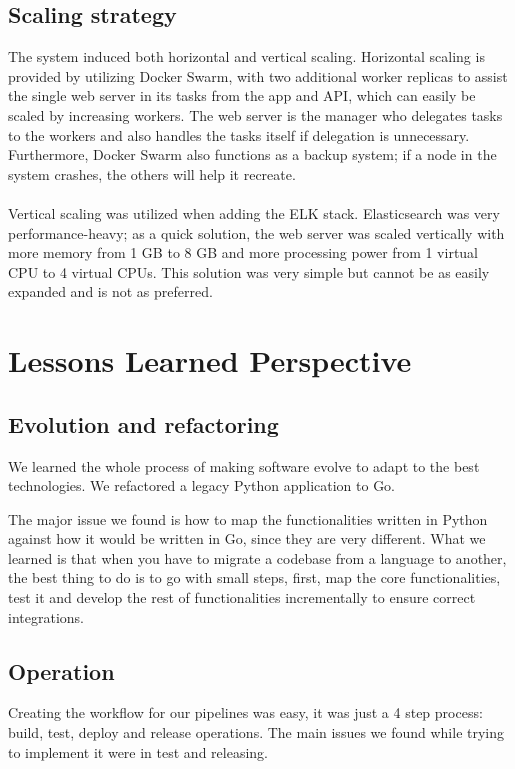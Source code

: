 \documentclass[12pt, a4paper, oneside]{book}
\begin{document}
\section{Scaling strategy}
The system induced both horizontal and vertical scaling.
Horizontal scaling is provided by utilizing Docker Swarm, with two additional worker replicas to assist the single web server in its tasks from the app and API, which can easily be scaled by increasing workers.
The web server is the manager who delegates tasks to the workers and also handles the tasks itself if delegation is unnecessary.
Furthermore, Docker Swarm also functions as a backup system; if a node in the system crashes, the others will help it recreate.\\
\\
Vertical scaling was utilized when adding the ELK stack.
Elasticsearch was very performance-heavy; as a quick solution, the web server was scaled vertically with more memory from 1 GB to 8 GB and more processing power from 1 virtual CPU to 4 virtual CPUs.
This solution was very simple but cannot be as easily expanded and is not as preferred.

\chapter{Lessons Learned Perspective}

\section{Evolution and refactoring}
We learned the whole process of making software evolve to adapt to the best technologies. We refactored a legacy Python application to Go.\bigskip

The major issue we found is how to map the functionalities written in Python against how it would be written in Go, since they are very different. What we learned is that when you have to migrate a codebase from a language to another, the best thing to do is to go with small steps, first, map the core functionalities, test it and develop the rest of functionalities incrementally to ensure correct integrations.
\section{Operation}
Creating the workflow for our pipelines was easy, it was just a 4 step process: build, test, deploy and release operations.
The main issues we found while trying to implement it were in test and releasing. \bigskip
\end{document}
